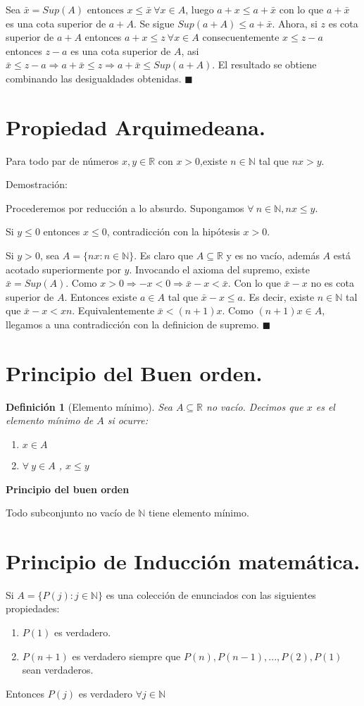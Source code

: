 \documentclass[12pt]{book}
\newcommand\R{{\mathbb R}}
\newcommand\N{{\mathbb N}}
\newtheorem{defi}{Definición}[section]
\begin{document}
Sea $\bar{x}=Sup(A) \mbox{ entonces } x \le \bar{x} \  \forall{x\in A}$, luego $a+x \le a+\bar{x}$ con lo que $a+\bar{x}$ es una cota superior de $a+A$. Se sigue $Sup(a+A) \le a+\bar{x}$. Ahora, si $z$ es cota superior de $a+A$ entonces $a+x \le z \ \forall{x \in A}$ consecuentemente $x \le z-a$ entonces $z-a$ es una cota superior de $A$, asi $\bar{x} \le z-a \Rightarrow a+\bar{x} \le z \Rightarrow a+\bar{x} \le Sup(a+A)$. El resultado se obtiene combinando las desigualdades obtenidas. $\blacksquare$
\section{Propiedad Arquimedeana.}
Para todo par de números $x,y\in \R$ con $x> 0$,existe $n\in\N$ tal que $nx> y$.

Demostración:

Procederemos por reducción a lo absurdo. Supongamos $\forall \ n\in\mathbb{N},nx\le{y}$.

Si $y\le{0}$ entonces $x\le{0}$, contradicción con la hipótesis $x>0$.

Si $y>0$, sea $A=\lbrace nx:n\in \N \rbrace$.
Es claro que $A\subseteq{\R}$ y es no vacío, además $A$ está acotado superiormente por $y$.
Invocando el axioma del supremo, existe $\bar{x}=Sup(A)$.
Como $x>0 \Rightarrow -x<0\Rightarrow \bar{x}-x<\bar{x}$.
Con lo que $\bar{x}-x$ no es cota superior de $A$.
Entonces existe $a \in A$ tal que $\bar{x}-x \le a$.
Es decir, existe $n\in\N$ tal que $\bar{x}-x<xn$. Equivalentemente $\bar{x}<(n+1)x$.
Como $(n+1)x\in{A}$, llegamos a una contradicción con la definicion de supremo. $\blacksquare$
\section{Principio del Buen orden.}
\begin{defi}[Elemento mínimo]\rm
Sea $A\subseteq\R$ no vacío. Decimos que $x$ es el elemento mínimo de $A$ si ocurre:
\begin{enumerate}
    \item $x\in{A}$
    \item $\forall \ y\in{A}$ , $x\le{y}$
\end{enumerate}
\end{defi}
\textbf{Principio del buen orden}

Todo subconjunto no vacío de $\N$ tiene elemento mínimo.
\section{Principio de Inducción matemática.}
Si $A=\lbrace P(j):j\in \N \rbrace$ es una colección de enunciados con las siguientes propiedades:
\begin{enumerate}
    \item $P(1)$ es verdadero.
    \item $P(n+1)$ es verdadero siempre que $P(n),P(n-1),...,P(2),P(1)$ sean verdaderos.
\end{enumerate}
Entonces $P(j)$ es verdadero $\forall j\in \N$
\end{document}
